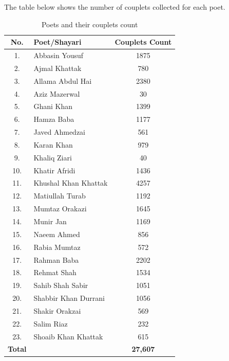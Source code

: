 The table below shows the number of couplets collected for each poet.
\begin{table}[H]
    \centering
    \begin{tabular}{|c|p{10em}|c|}
        \hline
        \rowcolor{lightgray} \textbf{No.} & \textbf{Poet/Shayari} & \textbf{Couplets Count} \\ \hline
        1. & Abbasin Yousuf & 1875 \\ \hline
        2. & Ajmal Khattak & 780 \\ \hline
        3. & Allama Abdul Hai & 2380 \\ \hline
        4. & Aziz Mazerwal & 30 \\ \hline
        5. & Ghani Khan & 1399 \\ \hline
        6. & Hamza Baba & 1177 \\ \hline
        7. & Javed Ahmedzai & 561 \\ \hline
        8. & Karan Khan & 979 \\ \hline
        9. & Khaliq Ziari & 40 \\ \hline
        10. & Khatir Afridi & 1436 \\ \hline
        11. & Khushal Khan Khattak & 4257 \\ \hline
        12. & Matiullah Turab & 1192 \\ \hline
        13. & Mumtaz Orakazi & 1645 \\ \hline
        14. & Munir Jan & 1169 \\ \hline
        15. & Naeem Ahmed & 856 \\ \hline
        16. & Rabia Mumtaz & 572 \\ \hline
        17. & Rahman Baba & 2202 \\ \hline
        18. & Rehmat Shah & 1534 \\ \hline
        19. & Sahib Shah Sabir & 1051 \\ \hline
        20. & Shabbir Khan Durrani & 1056 \\ \hline
        21. & Shakir Orakzai & 569 \\ \hline
        22. & Salim Riaz & 232 \\ \hline
        23. & Shoaib Khan Khattak & 615 \\ \hline
        \cellcolor{lightgray} \textbf{Total} & & \textbf{27,607} \\ \hline
    \end{tabular}
    \caption{Poets and their couplets count}
    \label{tab:poets-couplets-table}
\end{table}

